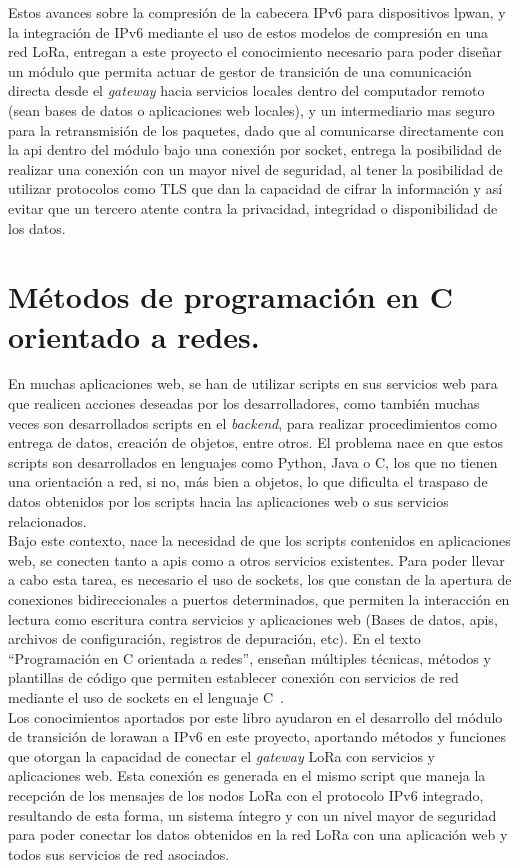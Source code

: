 \begin{justify}
Estos avances sobre la compresión de la cabecera IPv6 para dispositivos \gls{lpwan}, y la integración de IPv6 mediante el uso de estos modelos de compresión en una red LoRa, entregan a este proyecto el conocimiento necesario para poder diseñar un módulo que permita actuar de gestor de transición de una comunicación directa desde el \textit{gateway} hacia servicios locales dentro del computador remoto (sean bases de datos o aplicaciones web locales), y un intermediario mas seguro para la retransmisión de los paquetes, dado que al comunicarse directamente con la \gls{api} dentro del módulo bajo una conexión por \gls{socket}, entrega la posibilidad de realizar una conexión con un mayor nivel de seguridad, al tener la posibilidad de utilizar protocolos como TLS que dan la capacidad de cifrar la información y así evitar que un tercero atente contra la privacidad, integridad o disponibilidad de los datos.
\newpage
\section{Métodos de programación en C orientado a redes.}
En muchas aplicaciones web, se han de utilizar scripts en sus servicios web para que realicen acciones deseadas por los desarrolladores, como también muchas veces son desarrollados scripts en el \textit{backend}, para realizar procedimientos como entrega de datos, creación de objetos, entre otros. El problema nace en que estos scripts son desarrollados en lenguajes como Python, Java o C, los que no tienen una orientación a red, si no, más bien a objetos, lo que dificulta el traspaso de datos obtenidos por los scripts hacia las aplicaciones web o sus servicios relacionados.\\
Bajo este contexto, nace la necesidad de que los scripts contenidos en aplicaciones web, se conecten tanto a \glspl{api} como a otros servicios existentes. Para poder llevar a cabo esta tarea, es necesario el uso de \glspl{socket}, los que constan de la apertura de conexiones bidireccionales a puertos determinados, que permiten la interacción en lectura como escritura contra servicios y aplicaciones web (Bases de datos, \glspl{api}, archivos de configuración, registros de depuración, etc). En el texto ``Programación en C orientada a redes'', enseñan múltiples técnicas, métodos y plantillas de código que permiten establecer conexión con servicios de red mediante el uso de \glspl{socket} en el lenguaje C~\cite{network}.\\
Los conocimientos aportados por este libro ayudaron en el desarrollo del módulo de transición de \gls{lorawan} a IPv6 en este proyecto, aportando métodos y funciones que otorgan la capacidad de conectar el \textit{gateway} LoRa con servicios y aplicaciones web. Esta conexión es generada en el mismo script que maneja la recepción de los mensajes de los nodos LoRa con el protocolo IPv6 integrado, resultando de esta forma, un sistema íntegro y con un nivel mayor de seguridad para poder conectar los datos obtenidos en la red LoRa con una aplicación web y todos sus servicios de red asociados.
\end{justify}